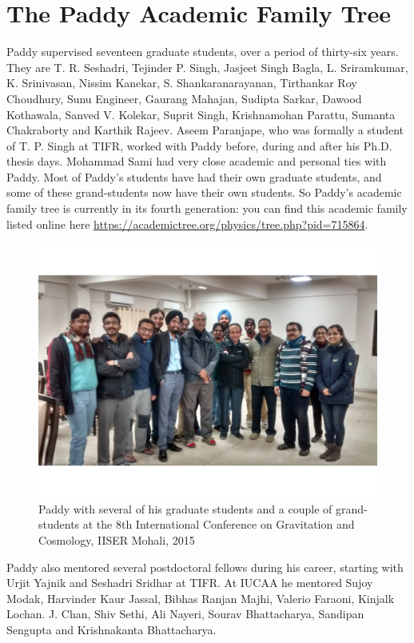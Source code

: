 \documentclass[prd, preprint, longbibliography, 12pt]{revtex4-2}
\begin{document}
\section{The Paddy Academic Family Tree}
\noindent Paddy supervised seventeen graduate students, over a period of thirty-six years. They are T. R. Seshadri, Tejinder P. Singh, Jasjeet Singh Bagla, L. Sriramkumar, K. Srinivasan, Nissim Kanekar, S. Shankaranarayanan, Tirthankar Roy Choudhury, Sunu Engineer, Gaurang Mahajan, Sudipta Sarkar, Dawood Kothawala, Sanved V. Kolekar, Suprit Singh, Krishnamohan Parattu, Sumanta Chakraborty and  Karthik Rajeev. Aseem Paranjape, who was formally a student of T. P. Singh at TIFR,  worked with Paddy before, during and after his Ph.D. thesis days. Mohammad Sami had very close academic and personal ties with Paddy. Most of Paddy's students have had their own graduate students, and some of these grand-students now have their own students. So Paddy's academic family tree is currently in its fourth generation: you can find this academic family listed online here \url{https://academictree.org/physics/tree.php?pid=715864}.
\begin{figure}[!h]
\centering
\includegraphics[width=12.00cm]{icgc19paddy.jpeg}
\caption*{Paddy with several of his graduate students and a couple of grand-students at the 8th International Conference on Gravitation and Cosmology, IISER Mohali, 2015} 
\end{figure}
Paddy also mentored several postdoctoral fellows during his career, starting with Urjit Yajnik and Seshadri Sridhar at TIFR. At IUCAA he mentored Sujoy Modak, Harvinder Kaur Jassal, Bibhas Ranjan Majhi, Valerio Faraoni, Kinjalk Lochan. J. Chan, Shiv Sethi, Ali Nayeri, Sourav Bhattacharya, Sandipan Sengupta and Krishnakanta Bhattacharya.
\end{document}
